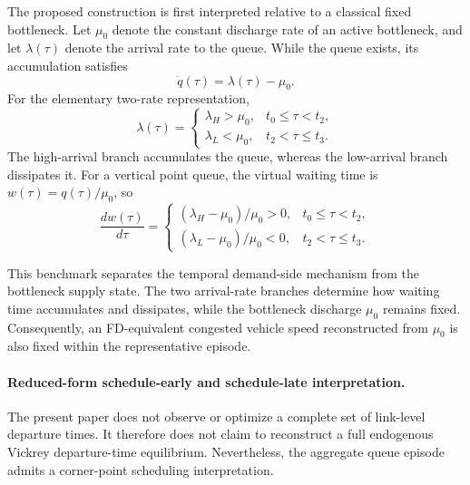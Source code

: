 The proposed construction is first interpreted relative to a classical
fixed bottleneck. Let $\mu_0$ denote the constant discharge rate of an active
bottleneck, and let $\lambda(\tau)$ denote the arrival rate to the queue.
While the queue exists, its accumulation satisfies
\begin{equation}
\label{eq:fixed_bottleneck_accumulation}
\dot q(\tau)=\lambda(\tau)-\mu_0.
\end{equation}
For the elementary two-rate representation,
\begin{equation}
\label{eq:two_arrival_rates}
\lambda(\tau)=
\begin{cases}
\lambda_H>\mu_0, & t_0\leq\tau<t_2,\\[1mm]
\lambda_L<\mu_0, & t_2<\tau\leq t_3.
\end{cases}
\end{equation}
The high-arrival branch accumulates the queue, whereas the low-arrival branch
dissipates it. For a vertical point queue, the virtual waiting time is
$w(\tau)=q(\tau)/\mu_0$, so
\begin{equation}
\label{eq:waiting_slopes_fixed_bottleneck}
\frac{dw(\tau)}{d\tau}
=
\begin{cases}
(\lambda_H-\mu_0)/\mu_0>0,
& t_0\leq\tau<t_2,\\[2mm]
(\lambda_L-\mu_0)/\mu_0<0,
& t_2<\tau\leq t_3.
\end{cases}
\end{equation}

This benchmark separates the temporal demand-side mechanism from the
bottleneck supply state. The two arrival-rate branches determine how waiting
time accumulates and dissipates, while the bottleneck discharge $\mu_0$
remains fixed. Consequently, an FD-equivalent congested vehicle speed
reconstructed from $\mu_0$ is also fixed within the representative episode.

\paragraph{Reduced-form schedule-early and schedule-late interpretation.}
The present paper does not observe or optimize a complete set of link-level
departure times. It therefore does not claim to reconstruct a full endogenous
Vickrey departure-time equilibrium. Nevertheless, the aggregate queue episode
admits a corner-point scheduling interpretation.

